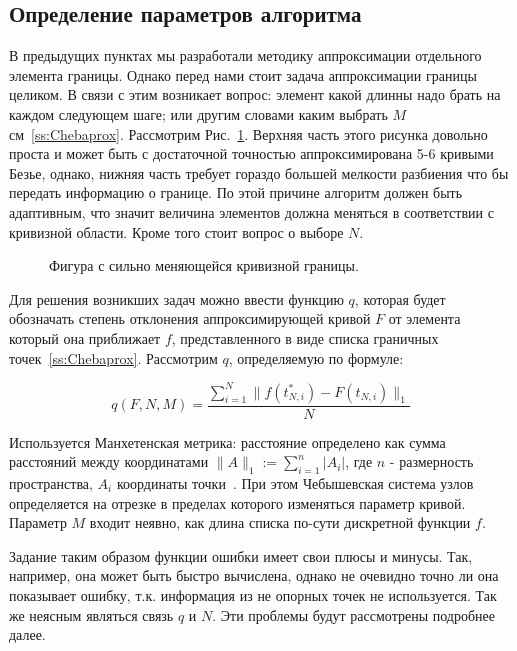 \documentclass[a4paper,12pt]{report}
\begin{document}
\subsection{Определение параметров алгоритма}

В предыдущих пунктах мы разработали методику аппроксимации отдельного элемента границы. Однако перед нами стоит задача аппроксимации границы целиком. В связи с этим возникает вопрос: элемент какой длинны надо брать на каждом следующем шаге; или другим словами каким выбрать $M$ см~\ref{ss:Chebaprox}. Рассмотрим Рис.~\ref{ris:bob}. Верхняя часть этого рисунка довольно проста и может быть с достаточной точностью аппроксимирована 5-6 кривыми Безье, однако, нижняя часть требует гораздо большей мелкости разбиения что бы передать информацию о границе. По этой причине алгоритм должен быть адаптивным, что значит величина элементов должна меняться в соответствии с кривизной области. Кроме того стоит вопрос о выборе $N$. 

\begin{figure}[h]
\caption{Фигура с сильно меняющейся кривизной границы.}
\label{ris:bob}
\end{figure}

Для решения возникших задач можно ввести функцию $q$, которая будет обозначать степень отклонения аппроксимирующей кривой $F$ от элемента который она приближает $f$, представленного в виде списка граничных точек~\ref{ss:Chebaprox}. Рассмотрим $q$, определяемую по формуле:

\begin{equation} \label{eq:qfunction} 
q(F,N,M)= \frac{\sum^N_{i=1}{\|f(t^*_{N,i})-F(t_{N,i})\|_1}}{N}
\end{equation}

Используется Манхетенская метрика: расстояние определено как сумма расстояний между координатами $\|A\|_1 := \sum_{i=1}^{n} |A_i|$, где $n$ - размерность пространства, $A_i$ координаты точки~\cite{Taxicab Geometry}. При этом Чебышевская система узлов определяется на отрезке в пределах которого изменяться параметр кривой. Параметр $M$ входит неявно, как длина списка по-сути дискретной функции $f$.

Задание таким образом функции ошибки имеет свои плюсы и минусы. Так, например, она может быть быстро вычислена, однако не очевидно точно ли она показывает ошибку, т.к. информация из не опорных точек не используется. Так же неясным являться связь $q$ и $N$. Эти проблемы будут рассмотрены подробнее далее. 
\end{document}
